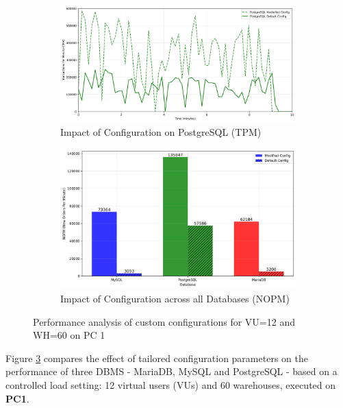 \begin{figure}[H]
    \hspace*{-1.7cm}
    \begin{subfigure}[b]{0.6\textwidth}
        \centering
        \includegraphics[width=\linewidth]{Images/dcnf_database_count_comparison_PostgreSQL.png}
        \caption{Impact of Configuration on PostgreSQL (TPM)}
        \label{fig:pg-dcnf}
    \end{subfigure}%
    \begin{subfigure}[b]{0.6\textwidth}
        \centering
        \includegraphics[width=\linewidth]{Images/hammerdb_summary_comparison_dcnf.png}
        \caption{Impact of Configuration across all Databases (NOPM)}
        \label{fig:nopm-dcnf}
    \end{subfigure}

    \caption{Performance analysis of custom configurations for VU=12 and WH=60 on PC 1}
    \label{fig:dcnf-all}
    
\end{figure}

Figure \ref{fig:dcnf-all} compares the effect of tailored configuration parameters on the performance of three DBMS - MariaDB, MySQL and PostgreSQL - based on a controlled load setting: 12 virtual users (VUs) and 60 warehouses, executed on \textbf{PC1}.

